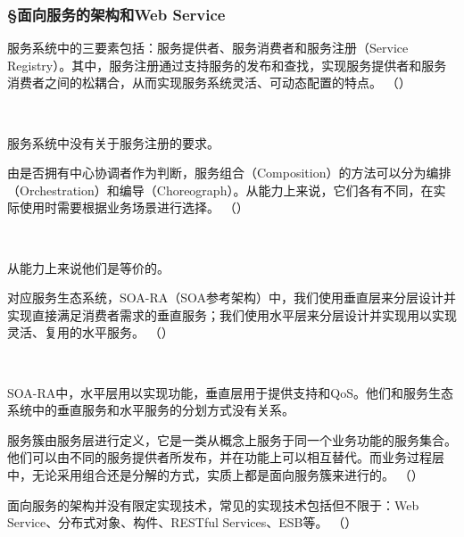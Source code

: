 \subsubsection*{\S 面向服务的架构和Web Service}
\setcounter{problemname}{0}

\begin{problem}
	服务系统中的三要素包括：服务提供者、服务消费者和服务注册（Service Registry）。其中，服务注册通过支持服务的发布和查找，实现服务提供者和服务消费者之间的松耦合，从而实现服务系统灵活、可动态配置的特点。
	\hfill （）
\end{problem}
\\ \begin{solution}
	服务系统中没有关于服务注册的要求。
\end{solution}


\begin{problem}
	由是否拥有中心协调者作为判断，服务组合（Composition）的方法可以分为编排（Orchestration）和编导（Choreograph）。从能力上来说，它们各有不同，在实际使用时需要根据业务场景进行选择。
	\hfill （）
\end{problem}
\\ \begin{solution}
	从能力上来说他们是等价的。
\end{solution}


\begin{problem}
	对应服务生态系统，SOA-RA（SOA参考架构）中，我们使用垂直层来分层设计并实现直接满足消费者需求的垂直服务；我们使用水平层来分层设计并实现用以实现灵活、复用的水平服务。
	\hfill （）
\end{problem}
\\ \begin{solution}
	SOA-RA中，水平层用以实现功能，垂直层用于提供支持和QoS。他们和服务生态系统中的垂直服务和水平服务的分划方式没有关系。
\end{solution}


\begin{problem}
	服务簇由服务层进行定义，它是一类从概念上服务于同一个业务功能的服务集合。他们可以由不同的服务提供者所发布，并在功能上可以相互替代。而业务过程层中，无论采用组合还是分解的方式，实质上都是面向服务簇来进行的。
	\hfill （）
\end{problem}


\begin{problem}
	面向服务的架构并没有限定实现技术，常见的实现技术包括但不限于：Web Service、分布式对象、构件、RESTful Services、ESB等。
	\hfill （）
\end{problem}


